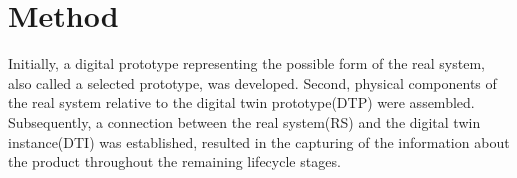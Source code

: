 \documentclass[conference]{IEEEtran}
\begin{document}
    \section{Method}\label{section:components}
    Initially, a digital prototype representing the possible form of the real system, 
    also called a selected prototype, was developed. Second, physical components of the real system 
    relative to the digital twin prototype(DTP) were assembled. Subsequently, a connection between the real system(RS) 
    and the digital twin instance(DTI) was established, 
    resulted in the capturing of the information about the product throughout the remaining lifecycle stages.

    
    
    
    
\end{document}

